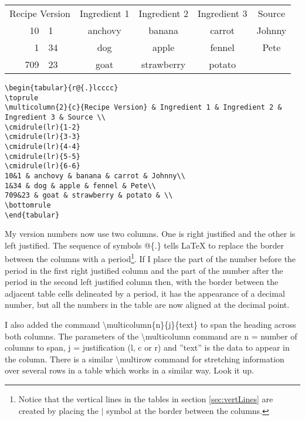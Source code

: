 \begin{center}
\begin{tabular}{r@{.}lcccc}
\toprule
\multicolumn{2}{c}{Recipe Version} & Ingredient 1 & Ingredient 2 & Ingredient 3 & Source \\
\cmidrule(lr){1-2}
\cmidrule(lr){3-3}
\cmidrule(lr){4-4}
\cmidrule(lr){5-5}
\cmidrule(lr){6-6}
10&1 & anchovy & banana & carrot & Johnny\\
1&34 & dog & apple & fennel & Pete\\
709&23 & goat & strawberry & potato & \\
\bottomrule
\end{tabular}

\vspace*{2ex}

\begin{verbatim}
\begin{tabular}{r@{.}lcccc}
\toprule
\multicolumn{2}{c}{Recipe Version} & Ingredient 1 & Ingredient 2 & Ingredient 3 & Source \\
\cmidrule(lr){1-2}
\cmidrule(lr){3-3}
\cmidrule(lr){4-4}
\cmidrule(lr){5-5}
\cmidrule(lr){6-6}
10&1 & anchovy & banana & carrot & Johnny\\
1&34 & dog & apple & fennel & Pete\\
709&23 & goat & strawberry & potato & \\
\bottomrule
\end{tabular}
\end{verbatim}
\end{center}

My version numbers now use two columns. One is right justified and the other is left justified.  The sequence of symbols @\{.\} tells LaTeX to replace the border between the columns with a period\footnote{Notice that the vertical lines in the tables in section \ref{sec:vertLines} are created by placing the $|$ symbol at the border between the columns.}. If I place the part of the number before the period in the first right justified column and the part of the number after the period in the second left justified column then, with the border between the adjacent table cells delineated by a period, it has the appearance of a decimal number, but all the numbers in the table are now aligned at the decimal point.

I also added the command {\textbackslash}multicolumn\{n\}\{j\}\{text\} to span the heading across both columns. The parameters of the {\textbackslash}multicolumn command are n = number of columns to span, j = justification (l, c or r) and ''text'' is the data to appear in the column. There is a similar {\textbackslash}multirow command for stretching information over several rows in a table which works in a similar way. Look it up.
\pagebreak

